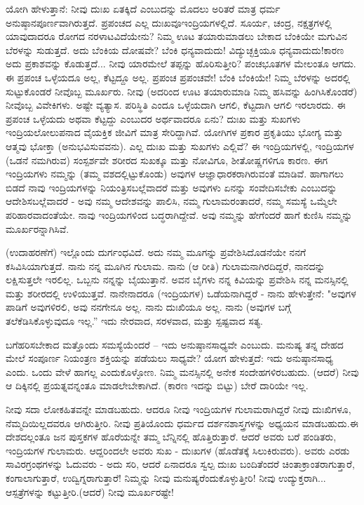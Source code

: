 ಯೋಗಿ ಹೇಳುತ್ತಾನೆ: ನೀವು ದುಃಖ ಏತಕ್ಕಿದೆ ಎಂಬುದನ್ನು ಮೊದಲು ಅರಿತರೆ ಮಾತ್ರ ಧರ್ಮ ಅನುಷ್ಠಾನಪೂರ್ಣವಾಗಿರುತ್ತದೆ. ಪ್ರಪಂಚದ ಎಲ್ಲ ದುಃಖವೂ\break ಇಂದ್ರಿಯಗಳಲ್ಲಿದೆ. ಸೂರ್ಯ, ಚಂದ್ರ, ನಕ್ಷತ್ರಗಳಲ್ಲಿ ಯಾವುದಾದರೂ ರೋಗದ ನರಳಾಟವಿದೆಯೇನು? ನಿಮ್ಮ ಊಟ ತಯಾರುಮಾಡಲು ಬೇಕಾದ ಬೆಂಕಿಯೇ ಮಗುವಿನ ಬೆರಳನ್ನು ಸುಡುತ್ತದೆ. ಅದು ಬೆಂಕಿಯ ದೋಷವೇ? ಬೆಂಕಿ ಧನ್ಯವಾದುದು! ವಿದ್ಯುಚ್ಛಕ್ತಿಯೂ ಧನ್ಯವಾದುದು!ಕಾರಣ ಅದು ಪ್ರಕಾಶವನ್ನು ಕೊಡುತ್ತದೆ... ನೀವು ಯಾರಮೇಲೆ ತಪ್ಪನ್ನು ಹೊರಿಸುತ್ತೀರಿ? ಪಂಚಭೂತಗಳ ಮೇಲಂತೂ ಆಗದು. ಈ ಪ್ರಪಂಚ ಒಳ್ಳೆಯದೂ ಅಲ್ಲ, ಕೆಟ್ಟದ್ದೂ ಅಲ್ಲ. ಪ್ರಪಂಚ ಪ್ರಪಂಚವೇ! ಬೆಂಕಿ ಬೆಂಕಿಯೇ! ನಿಮ್ಮ ಬೆರಳನ್ನು ಅದರಲ್ಲಿ ಸುಟ್ಟುಕೊಂಡರೆ ನೀವೊಬ್ಬ ಮೂರ್ಖರು. ನೀವು (ಅದರಿಂದ ಊಟ ತಯಾರುಮಾಡಿ ನಿಮ್ಮ ಹಸಿವನ್ನು ಹಿಂಗಿಸಿಕೊಂಡರೆ) ನೀವೊಬ್ಬ ವಿವೇಕಿಗಳು. ಅಷ್ಟೇ ವ್ಯತ್ಯಾಸ. ಪರಿಸ್ಥಿತಿ ಎಂದೂ ಒಳ್ಳೆಯದಾಗಿ ಆಗಲಿ, ಕೆಟ್ಟದಾಗಿ ಆಗಲಿ ಇರಲಾರದು. ಈ ಪ್ರಪಂಚ ಒಳ್ಳೆಯದು ಅಥವಾ ಕೆಟ್ಟದ್ದು ಎಂಬುದರ ಅರ್ಥವಾದರೂ ಏನು? ದುಃಖ ಮತ್ತು ಸುಖಗಳು ಇಂದ್ರಿಯಲೋಲುಪನಾದ ವೈಯಕ್ತಿಕ ಜೀವಿಗೆ ಮಾತ್ರ ಸೇರಿದ್ದಾಗಿವೆ. ಯೋಗಿಗಳ ಪ್ರಕಾರ ಪ್ರಕೃತಿಯು ಭೋಗ್ಯ ಮತ್ತು ಆತ್ಮವು ಭೋಕ್ತಾ (ಅನುಭವಿಸುವವನು). ಎಲ್ಲ ದುಃಖ ಮತ್ತು ಸುಖಗಳು ಎಲ್ಲಿವೆ? ಈ ಇಂದ್ರಿಯಗಳಲ್ಲಿ, ಇಂದ್ರಿಯಗಳ (ಒಡನೆ ನಮಗಿರುವ) ಸಂಸ್ಪರ್ಶವೇ ಶರೀರದ ಸುಖಕ್ಕೂ ಮತ್ತು ನೋವಿಗೂ, ಶೀತೋಷ್ಣಗಳಿಗೂ ಕಾರಣ. ಈಗ ಇಂದ್ರಿಯಗಳು ನಮ್ಮನ್ನು (ತಮ್ಮ ವಶದಲ್ಲಿಟ್ಟುಕೊಂಡು) ಅವುಗಳ ಆಜ್ಞಾಧಾರಕರಾಗಿರುವಂತೆ ಮಾಡಿವೆ. ಹಾಗಾಗಲು ಬಿಡದೆ ನಾವು ಇಂದ್ರಿಯಗಳನ್ನು ನಿಯಂತ್ರಿಸಬಲ್ಲೆವಾದರೆ ಮತ್ತು ಅವುಗಳು ಏನನ್ನು ಸಂವೇದಿಸಬೇಕು ಎಂಬುದನ್ನು ಆದೇಶಿಸಬಲ್ಲೆವಾದರೆ - ಅವು ನಮ್ಮ ಆದೇಶವನ್ನು ಪಾಲಿಸಿ, ನಮ್ಮ ಗುಲಾಮರಂತಾದರೆ, ನಮ್ಮ ಸಮಸ್ಯೆ ಒಮ್ಮೆಲೇ ಪರಿಹಾರವಾದಂತೆಯೇ. ನಾವು ಇಂದ್ರಿಯಗಳಿಂದ ಬದ್ಧರಾಗಿದ್ದೇವೆ. ಅವು ನಮ್ಮನ್ನು ಹೇಗೆಂದರೆ ಹಾಗೆ ಕುಣಿಸಿ ನಮ್ಮನ್ನು ಮೂರ್ಖರನ್ನಾಗಿಸಿವೆ.

(ಉದಾಹರಣೆಗೆ) ಇಲ್ಲೊಂದು ದುರ್ಗಂಧವಿದೆ. ಅದು ನಮ್ಮ ಮೂಗನ್ನು ಪ್ರವೇಶಿಸಿದೊಡನೆಯೇ ನನಗೆ ಕಸಿವಿಸಿಯಾಗುತ್ತದೆ. ನಾನು ನನ್ನ ಮೂಗಿನ ಗುಲಾಮ. ನಾನು (ಆ ರೀತಿ) ಗುಲಾಮನಾಗಿರದಿದ್ದರೆ, ನಾನದನ್ನು ಲಕ್ಷಿಸುತ್ತಲೇ ಇರಲಿಲ್ಲ. ಒಬ್ಬನು ನನ್ನನ್ನು ಬೈಯುತ್ತಾನೆ. ಅವನ ಬೈಗಳು ನನ್ನ ಕಿವಿಯನ್ನು ಪ್ರವೇಶಿಸಿ ನನ್ನ ಮನಸ್ಸಿನಲ್ಲಿ ಮತ್ತು ಶರೀರದಲ್ಲಿ ಉಳಿಯುತ್ತವೆ. ನಾನೇನಾದರೂ (ಇಂದ್ರಿಯಗಳ) ಒಡೆಯನಾಗಿದ್ದರೆ - ನಾನು ಹೇಳುತ್ತೇನೆ: "ಅವುಗಳ ಪಾಡಿಗೆ ಅವುಗಳಿರಲಿ, ಅವು ನನಗೇನೂ ಅಲ್ಲ. ನಾನು ದುಃಖಿಯೂ ಅಲ್ಲ. ನಾನು (ಅವುಗಳ ಬಗ್ಗೆ ತಲೆಕೆಡಿಸಿಕೊಳ್ಳುವುದೂ ಇಲ್ಲ.” ಇದು ನೇರವಾದ, ಸರಳವಾದ, ಮತ್ತು ಸ್ಪಷ್ಟವಾದ ಸತ್ಯ.

ಬಗೆಹರಿಸಬೇಕಾದ ಮತ್ತೊಂದು ಸಮಸ್ಯೆಯೆಂದರೆ – ಇದು ಅನುಷ್ಠಾನಸಾಧ್ಯವೇ ಎಂಬುದು. ಮನುಷ್ಯ ತನ್ನ ದೇಹದ ಮೇಲೆ ಸಂಪೂರ್ಣ ನಿಯಂತ್ರಣ ಶಕ್ತಿಯನ್ನು ಪಡೆಯಲು ಸಾಧ್ಯವೇ? ಯೋಗ ಹೇಳುತ್ತದೆ: ಇದು ಅನುಷ್ಠಾನಸಾಧ್ಯ ಎಂದು. ಒಂದು ವೇಳೆ ಹಾಗಲ್ಲ ಎಂದುಕೊಳ್ಳೋಣ. ನಿಮ್ಮ ಮನಸ್ಸಿನಲ್ಲಿ ಅನೇಕ ಸಂದೇಹಗಳಿರಬಹುದು. (ಆದರೆ) ನೀವು ಆ ದಿಕ್ಕಿನಲ್ಲಿ ಪ್ರಯತ್ನವನ್ನಂತೂ ಮಾಡಲೇಬೇಕಾಗಿದೆ. (ಕಾರಣ ಇದನ್ನು ಬಿಟ್ಟು) ಬೇರೆ ದಾರಿಯೇ ಇಲ್ಲ.

ನೀವು ಸದಾ ಲೋಕಹಿತವನ್ನೇ ಮಾಡಬಹುದು. ಆದರೂ ನೀವು ಇಂದ್ರಿಯಗಳ ಗುಲಾಮರಾಗಿದ್ದರೆ ನೀವು ದುಃಖಿಗಳೂ, ನೆಮ್ಮದಿಯಿಲ್ಲದವರೂ ಆಗಿರುತ್ತೀರಿ. ನೀವು ಪ್ರತಿಯೊಂದು ಧರ್ಮದ ದರ್ಶನಶಾಸ್ತ್ರಗಳನ್ನು ಅಧ್ಯಯನ ಮಾಡಬಹುದು.\break ಈ ದೇಶದಲ್ಲಂತೂ ಜನ ಪುಸ್ತಕಗಳ ಹೊರೆಯನ್ನೇ ತಮ್ಮ ಬೆನ್ನಿನಲ್ಲಿ ಹೊತ್ತಿರುತ್ತಾರೆ. ಆದರೆ ಅವರು ಬರೆ ಪಂಡಿತರು, ಇಂದ್ರಿಯಗಳ ಗುಲಾಮರು. ಆದ್ದರಿಂದಲೇ﻿ ಅವರು ಸುಖ - ದುಃಖಗಳ (ಹೊಡೆತಕ್ಕೆ ಸಿಲುಕಿರುವರು). ಅವರು ಎರಡು ಸಾವಿರ\break ಗ್ರಂಥಗಳನ್ನು ಓದುವರು - ಅದು ಸರಿ, ಆದರೆ ಏನಾದರೂ ಸ್ವಲ್ಪ ದುಃಖ ಬಂದಿತೆಂದರೆ ಚಿಂತಾಕ್ರಾಂತರಾಗುತ್ತಾರೆ, ಕಂಗಾಲಾಗುತ್ತಾರೆ, ಉದ್ವಿಗ್ನರಾಗುತ್ತಾರೆ! ನಿಮ್ಮನ್ನು ನೀವು ಮನುಷ್ಯರೆಂದುಕೊಳ್ಳುತ್ತೀರಿ! ನೀವು ಉದ್ಯುಕ್ತರಾಗಿ... ಆಸ್ಪತ್ರೆಗಳನ್ನು ಕಟ್ಟುತ್ತೀರಿ.\break (ಆದರೆ) ನೀವು ಮೂರ್ಖರಷ್ಟೇ!

